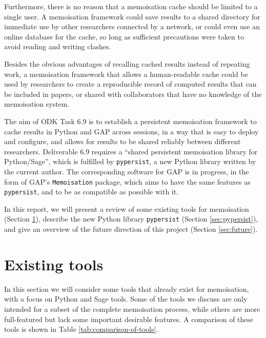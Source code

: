 \documentclass{deliverablereport}
\newcommand{\pypersist}{\texttt{pypersist}}
\begin{document}
Furthermore, there is no reason that a memoisation cache should be limited to a
single user.  A memoisation framework could save results to a shared directory
for immediate use by other researchers connected by a network, or could even
use an online database for the cache, so long as sufficient precautions were
taken to avoid reading and writing clashes.

Besides the obvious advantages of recalling cached results instead of repeating
work, a memoisation framework that allows a human-readable cache could be used
by researchers to create a reproducible record of computed results that can be
included in papers, or shared with collaborators that have no knowledge of the
memoisation system.

The aim of ODK Task 6.9 is to establish a persistent memoisation framework to
cache results in Python and GAP across sessions, in a way that is easy to deploy
and configure, and allows for results to be shared reliably between different
researchers.  Deliverable 6.9 requires a ``shared persistent memoisation library
for Python/Sage'', which is fulfilled by \pypersist{}, a new Python library
written by the current author.  The corresponding software for GAP is in
progress, in the form of GAP's \texttt{Memoisation} package, which aims to have
the same features as \pypersist{}, and to be as compatible as possible with it.

In this report, we will present a review of some existing tools for memoisation
(Section \ref{sec:existing}), describe the new Python library \pypersist{}
(Section \ref{sec:pypersist}), and give an overview of the future direction of
this project (Section \ref{sec:future}).

\section{Existing tools}
\label{sec:existing}

In this section we will consider some tools that already exist for memoisation,
with a focus on Python and Sage tools.  Some of the tools we discuss are only
intended for a subset of the complete memoisation process, while others are more
full-featured but lack some important desirable features.  A comparison of these
tools is shown in Table \ref{tab:comparison-of-tools}.
\end{document}
